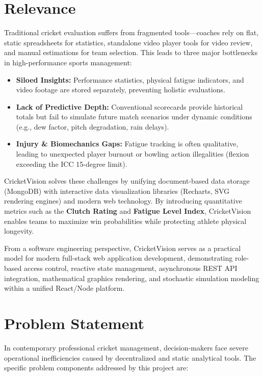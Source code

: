 \documentclass[12pt,a4paper]{report}
\begin{document}
\section{Relevance}
Traditional cricket evaluation suffers from fragmented tools—coaches rely on flat, static spreadsheets for statistics, standalone video player tools for video review, and manual estimations for team selection. This leads to three major bottlenecks in high-performance sports management:

\begin{itemize}
    \item \textbf{Siloed Insights:} Performance statistics, physical fatigue indicators, and video footage are stored separately, preventing holistic evaluations.
    \item \textbf{Lack of Predictive Depth:} Conventional scorecards provide historical totals but fail to simulate future match scenarios under dynamic conditions (e.g., dew factor, pitch degradation, rain delays).
    \item \textbf{Injury \& Biomechanics Gaps:} Fatigue tracking is often qualitative, leading to unexpected player burnout or bowling action illegalities (flexion exceeding the ICC 15-degree limit).
\end{itemize}

CricketVision solves these challenges by unifying document-based data storage (MongoDB) with interactive data visualization libraries (Recharts, SVG rendering engines) and modern web technology. By introducing quantitative metrics such as the \textbf{Clutch Rating} and \textbf{Fatigue Level Index}, CricketVision enables teams to maximize win probabilities while protecting athlete physical longevity.

From a software engineering perspective, CricketVision serves as a practical model for modern full-stack web application development, demonstrating role-based access control, reactive state management, asynchronous REST API integration, mathematical graphics rendering, and stochastic simulation modeling within a unified React/Node platform.

\section{Problem Statement}
In contemporary professional cricket management, decision-makers face severe operational inefficiencies caused by decentralized and static analytical tools. The specific problem components addressed by this project are:
\end{document}
